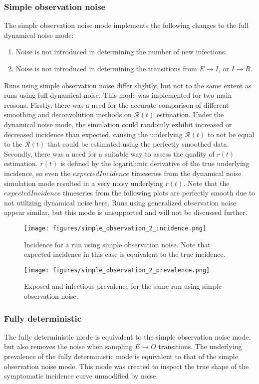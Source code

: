 \documentclass{article}
\newcommand{\nR}{\mathscr{R}}
\begin{document}
\subsubsection{Simple observation noise}
The simple observation noise mode implements the following changes to the full dynamical noise mode:
\begin{enumerate}
	\item Noise is not introduced in determining the number of new infections.
	\item Noise is not introduced in determining the transitions from $E \rightarrow I$, or $I \rightarrow R$. 
\end{enumerate}


Runs using simple observation noise differ slightly, but not to the same extent as runs using full dynamical noise. This mode was implemented for two main reasons. Firstly, there was a need for the accurate comparison of different smoothing and deconvolution methods on $\nR(t)$ estimation. Under the dynamical noise mode, the simulation could randomly exhibit increased or decreased incidence than expected, causing the underlying $\nR(t)$ to not be equal to the $\nR(t)$ that could be estimated using the perfectly smoothed data. Secondly, there was a need for a suitable way to assess the quality of $r(t)$ estimation. $r(t)$ is defined by the logarithmic derivative of the true underlying incidence, so even the $expectedIncidence$ timeseries from the dynamical noise simulation mode resulted in a very noisy underlying $r(t)$. Note that the $expectedIncidence$ timeseries from the following plots are perfectly smooth due to not utilizing dynamical noise here. Runs using generalized observation noise appear similar, but this mode is unsupported and will not be discussed further.

\begin{figure}[h!]
    \centering
    \texttt{[image: figures/simple\_observation\_2\_incidence.png]}
    \caption{Incidence for a run using simple observation noise. Note that expected incidence in this case is equivalent to the true incidence.}
\end{figure}

\clearpage
\begin{figure}[h!]
    \centering
    \texttt{[image: figures/simple\_observation\_2\_prevalence.png]}
    \caption{Exposed and infectious prevalence for the same run using simple observation noise.}
\end{figure}

\subsubsection{Fully deterministic}
The fully deterministic mode is equivalent to the simple observation noise mode, but also removes the noise when sampling $E \rightarrow O$ transitions. The underlying prevalence of the fully deterministic mode is equivalent to that of the simple observation noise mode. This mode was created to inspect the true shape of the symptomatic incidence curve unmodified by noise. 
\end{document}
